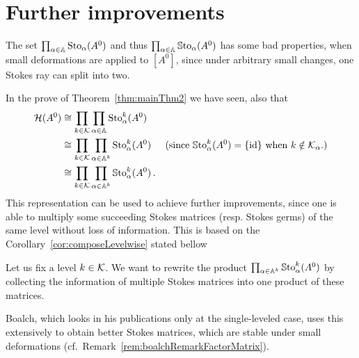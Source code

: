 \section{Further improvements}\label{sec:furtherImprovements}
The set $\prod_{\alpha\in\mathbb{A}}\operatorname{Sto}_\alpha(A^0)$ and thus
$\prod_{\alpha\in\mathbb{A}}\operatorname{\mathbb{S}to}_\alpha(A^0)$ has some bad properties, when small
deformations are applied to $[A^0]$, since under arbitrary small changes, one
Stokes ray can split into two.
\begin{comment}
  \begin{rem}\label{rem:boalchRemarkFactorMatrix}
    Boalch~\cite{boalch,thboalch}\PROBLEM[solution goes back to
    \cite{BJL1979Birkhoff} or so?] solves this in the single-leveled case by
    \rewrite{renaming our Stokes matrices as Stokes factors} and introducing
    new Stokes matrices which are build by the product of consecutive Stokes
    factors.
  \end{rem}
\end{comment}
In the prove of Theorem~\ref{thm:mainThm2} we have seen,  also that
\begin{align*}
  \mathcal{H}(A^0)&\cong\prod_{k\in\mathcal{K}}\prod_{\alpha\in\mathbb{A}}\operatorname{Sto}_\alpha^k(A^0)
  \\&\cong\prod_{k\in\mathcal{K}}\prod_{\alpha\in\mathbb{A}^k}\operatorname{Sto}_\alpha^k(A^0)
  &\text{(since $\operatorname{\mathbb{S}to}_{\alpha}^{k}(A^0)=\{\operatorname{id}\}$ when $k\notin\mathcal{K}_\alpha$.)}
  \\&\cong\prod_{k\in\mathcal{K}}\prod_{\alpha\in\mathbb{A}^k}\operatorname{\mathbb{S}to}_\alpha^k(A^0) \,.
\end{align*}
This representation can be used to achieve further improvements, since one is
able to multiply some succeeding Stokes matrices (resp. Stokes germs) of the
same level without loss of information.
This is based on the Corollary~\ref{cor:composeLevelwise} stated bellow

Let us fix a level $k\in\mathcal{K}$. We want to rewrite the product
$\prod_{\alpha\in\mathbb{A}^k}\operatorname{\mathbb{S}to}_\alpha^k(A^0)$ by collecting the information of
multiple Stokes matrices into one product of these matrices.

\TODO[move?]
Boalch, which looks in his publications \cite{boalch,thboalch} only at the
single-leveled case, uses this extensively to obtain better Stokes matrices,
which are stable under small deformations
(cf.\ Remark~\ref{rem:boalchRemarkFactorMatrix}).

